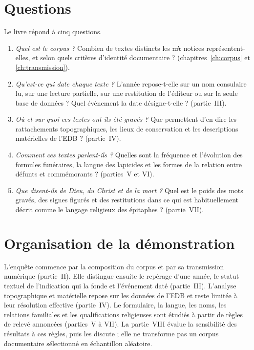 \section{Questions}

Le livre répond à cinq questions.

\begin{enumerate}[label=(\arabic*),leftmargin=2em]
\item \emph{Quel est le corpus ?} Combien de textes distincts les \st{nA} notices représentent-elles, et selon quels critères d’identité documentaire ? (chapitres~\ref{ch:corpus} et \ref{ch:transmission}).
\item \emph{Qu’est-ce qui date chaque texte ?} L’année repose-t-elle sur un nom consulaire lu, sur une lecture partielle, sur une restitution de l’éditeur ou sur la seule base de données ? Quel événement la date désigne-t-elle ? (partie~III).
\item \emph{Où et sur quoi ces textes ont-ils été gravés ?} Que permettent d’en dire les rattachements topographiques, les lieux de conservation et les descriptions matérielles de l’EDB ? (partie~IV).
\item \emph{Comment ces textes parlent-ils ?} Quelles sont la fréquence et l’évolution des formules funéraires, la langue des lapicides et les formes de la relation entre défunts et commémorants ? (parties~V et VI).
\item \emph{Que disent-ils de Dieu, du Christ et de la mort ?} Quel est le poids des mots gravés, des signes figurés et des restitutions dans ce qui est habituellement décrit comme le langage religieux des épitaphes ? (partie~VII).
\end{enumerate}

\section{Organisation de la démonstration}

L’enquête commence par la composition du corpus et par sa transmission numérique (partie~II). Elle distingue ensuite le repérage d’une année, le statut textuel de l’indication qui la fonde et l’événement daté (partie~III). L’analyse topographique et matérielle repose sur les données de l’EDB et reste limitée à leur résolution effective (partie~IV). Le formulaire, la langue, les noms, les relations familiales et les qualifications religieuses sont étudiés à partir de règles de relevé annoncées (parties~V à VII). La partie~VIII évalue la sensibilité des résultats à ces règles, puis les discute ; elle ne transforme pas un corpus documentaire sélectionné en échantillon aléatoire.

